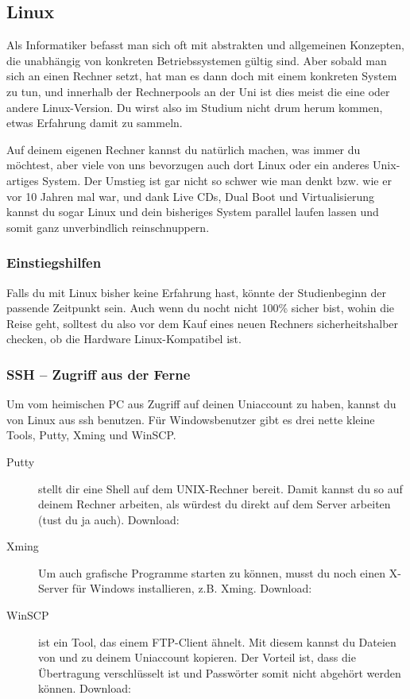 \subsection{Linux}
	\label{linux}
	Als Informatiker befasst man sich oft mit abstrakten und allgemeinen Konzepten, die unabhängig von konkreten Betriebssystemen gültig sind. Aber sobald man sich an einen Rechner setzt, hat man es dann doch mit einem konkreten System zu tun, und innerhalb der Rechnerpools an der Uni ist dies meist die eine oder andere Linux-Version. Du wirst also im Studium nicht drum herum kommen, etwas Erfahrung damit zu sammeln.

	Auf deinem eigenen Rechner kannst du natürlich machen, was immer du möchtest, aber viele von uns bevorzugen auch dort Linux oder ein anderes Unix-artiges System. Der Umstieg ist gar nicht so schwer wie man denkt bzw. wie er vor 10 Jahren mal war, und dank Live CDs, Dual Boot und Virtualisierung kannst du sogar Linux und dein bisheriges System parallel laufen lassen und somit ganz unverbindlich reinschnuppern.

	\subsubsection{Einstiegshilfen}
		Falls du mit Linux bisher keine Erfahrung hast, könnte der Studienbeginn der passende Zeitpunkt sein. Auch wenn du nocht nicht 100\% sicher bist, wohin die Reise geht, solltest du also vor dem Kauf eines neuen Rechners sicherheitshalber checken, ob die Hardware Linux-Kompatibel ist.

	\subsubsection{SSH -- Zugriff aus der Ferne}
		Um vom heimischen PC aus Zugriff auf deinen Uniaccount zu haben, kannst du von Linux aus ssh benutzen. Für Windowsbenutzer gibt es drei nette kleine Tools, Putty, Xming und WinSCP. %

		\begin{description}
			\item[Putty] stellt dir eine Shell auf dem UNIX-Rechner bereit. Damit kannst du so auf deinem Rechner arbeiten, als würdest du direkt
			  auf dem Server arbeiten (tust du ja auch).  Download: 
			\item[Xming] Um auch grafische Programme starten zu können, musst du noch einen X-Server für Windows
			  installieren, z.B. Xming. Download: 
			\item[WinSCP] ist ein Tool, das einem FTP-Client ähnelt. Mit diesem kannst du Dateien von und zu deinem Uniaccount kopieren. Der Vorteil ist, dass die Übertragung verschlüsselt ist und Passwörter somit nicht abgehört werden können. Download: 
		\end{description}

